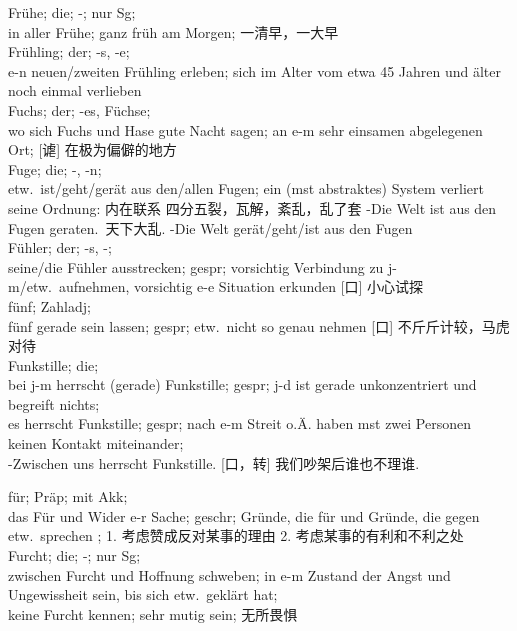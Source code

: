\noindent
Fr\"uhe; die; -; nur Sg;\\
in aller Fr\"uhe; ganz fr\"uh am Morgen; 一清早，一大早\\

\noindent
Fr\"uhling; der; -s, -e; \\
e-n neuen/zweiten Fr\"uhling erleben; sich im Alter vom etwa 45 Jahren und \"alter noch einmal verlieben \\

\noindent
Fuchs; der; -es, F\"uchse; \\
wo sich Fuchs und Hase gute Nacht sagen; an e-m sehr einsamen abgelegenen Ort; [谑] 在极为偏僻的地方 \\

\noindent
Fuge; die; -, -n; \\
etw.\ ist/geht/ger\"at aus den/allen Fugen; ein (mst abstraktes) System verliert seine Ordnung: 内在联系 四分五裂，瓦解，紊乱，乱了套 -Die Welt ist aus den Fugen geraten.\ 天下大乱. -Die Welt ger\"at/geht/ist aus den Fugen \\

\noindent
F\"uhler; der; -s, -; \\
seine/die F\"uhler ausstrecken; gespr; vorsichtig Verbindung zu j-m/etw.\ aufnehmen, vorsichtig e-e Situation erkunden [口] 小心试探\\

\noindent
f\"unf; Zahladj; \\
f\"unf gerade sein lassen; gespr; etw.\ nicht so genau nehmen [口] 不斤斤计较，马虎对待\\

\noindent
Funkstille; die;\\
bei j-m herrscht (gerade) Funkstille; gespr; j-d ist gerade unkonzentriert und begreift nichts; \\
es herrscht Funkstille; gespr; nach e-m Streit o.\"A. haben mst zwei Personen keinen Kontakt miteinander; \\
-Zwischen uns herrscht Funkstille. [口，转] 我们吵架后谁也不理谁.

\noindent
f\"ur; Pr\"ap; mit Akk; \\
das F\"ur und Wider e-r Sache; geschr; Gr\"unde, die f\"ur und Gr\"unde, die gegen etw.\ sprechen ; 1. 考虑赞成反对某事的理由 2. 考虑某事的有利和不利之处\\

\noindent
Furcht; die; -; nur Sg; \\
zwischen Furcht und Hoffnung schweben; in e-m Zustand der Angst und Ungewissheit sein, bis sich etw.\ gekl\"art hat; \\
keine Furcht kennen; sehr mutig sein; 无所畏惧\\

